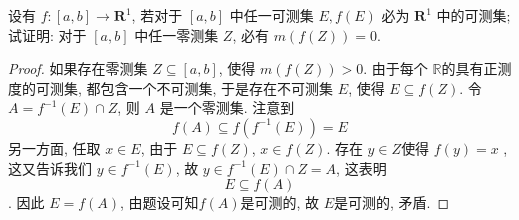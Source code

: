 \documentclass[../main.tex]{subfiles}
\begin{document}
\begin{exercise}{}{}
设有 $f:[a,b] \to \mathbf{R}^1$, 若对于 $[a,b]$ 中任一可测集 $E, f(E)$ 必为 $\mathbf{R}^1$ 中的可测集; 试证明: 对于 $[a,b]$ 中任一零测集 $Z$, 必有 $m(f(Z)) = 0$.
\end{exercise}

\begin{proof}
    如果存在零测集 \(  Z  \subseteq \left[ a,b \right] \), 使得 \(  m\left( f\left( Z \right)  \right)> 0   \). 由于每个 \(  \mathbb{R}   \)的具有正测度的可测集, 都包含一个不可测集, 于是存在不可测集 \(  E  \), 使得 \(  E\subseteq f\left( Z \right)   \). 令 \(  A= f^{-1} \left( E \right)\cap Z   \), 则 \(  A  \)    是一个零测集. 注意到 \[
    f\left( A \right)\subseteq f\left( f^{-1} \left( E \right)  \right)= E  
    \] 另一方面, 任取 \(  x\in E  \), 由于 \(  E\subseteq f\left( Z \right)   \), \(  x \in f\left( Z \right)   \).  存在 \(  y \in Z  \)使得 \(  f\left( y \right)= x   \)    , 这又告诉我们 \(  y \in f^{-1} \left( E \right)   \), 故 \(  y \in f^{-1} \left( E \right)\cap Z= A   \),   这表明 \[
    E\subseteq f\left( A \right) 
    \]  . 因此 \(  E= f\left( A \right)   \), 由题设可知\(  f\left( A \right)   \)是可测的, 故 \(  E  \)是可测的, 矛盾.   
\end{proof}
\end{document}
